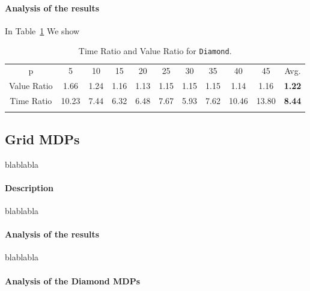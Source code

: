 \paragraph{Analysis of the results}
In Table~\ref{tab:diamond} We show


\begin{table}[h]																	
 \centering
 \small
 \setlength{\tabcolsep}{4.0pt}
 \renewcommand \arraystretch{1.8}
\begin{tabular}{ccccccccccc}																						
p	&	5	&	10	&	15	&	20	&	25	&	30	&	35	&	40	&	45	&	Avg.	\\	
\cmidrule(lr){1-1} \cmidrule(lr){2-10} \cmidrule(lr){11-11}
Value Ratio	&	1.66	&	1.24	&	1.16	&	1.13	&	1.15	&	1.15	&	1.15	&	1.14	&	1.16	&	\textbf{1.22}	\\	
Time Ratio	&	10.23	&	7.44	&	6.32	&	6.48	&	7.67	&	5.93	&	7.62	&	10.46	&	13.80	&	\textbf{8.44}	\\	\\
\end{tabular}
\caption{Time Ratio and Value Ratio for \texttt{Diamond}.}														\label{tab:diamond}								
\end{table}																						



\subsection{Grid MDPs}
blablabla
\paragraph{Description}
blablabla
\paragraph{Analysis of the results}
blablabla



\paragraph{Analysis of the Diamond MDPs}

